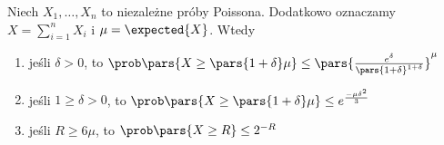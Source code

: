 \begin{theorem}
	\label{poisson-trial-chernoff-bounds}
	Niech \(X_1, \dots, X_n\) to niezależne próby Poissona. Dodatkowo oznaczamy \(X = \sum_{i=1}^n{X_i}\) i \(\mu = \expected{X}\). Wtedy
	\begin{enumerate}
		\item jeśli \(\delta > 0\), to \(\prob \pars{X \ge \pars{1+\delta}\mu} \le \pars{\frac{e^{\delta}}{ \pars{1+\delta}^{1+\delta}}} ^{\mu}\)   \\
		\item jeśli \(1 \geq \delta > 0\), to \(\prob \pars{X \ge \pars{1+\delta}\mu} \le e^{\frac{-\mu\delta^2}{3}}\)                                 \\
		\item jeśli \(R \ge 6\mu\), to \(\prob \pars{X \ge R} \le 2^{-R}\)
	\end{enumerate}
\end{theorem}
